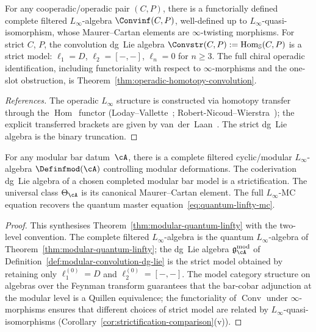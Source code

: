\begin{theorem}
\label{thm:operadic-homotopy-convolution-modular}
For any cooperadic/operadic pair $(C,P)$, there is a functorially
defined complete filtered $L_\infty$-algebra $\Convinf(C,P)$,
well-defined up to $L_\infty$-quasi-isomorphism, whose
Maurer--Cartan elements are $\infty$-twisting morphisms.
For strict $C$, $P$, the convolution dg~Lie algebra
$\Convstr(C,P) := \operatorname{Hom}_{\mathbb{S}}(C,P)$ is a
strict model: $\ell_1 = D$, $\ell_2 = [-,-]$,
$\ell_n = 0$ for $n \geq 3$.
The full chiral operadic identification, including
functoriality with respect to $\infty$-morphisms
and the one-slot obstruction, is
Theorem~\textup{\ref{thm:operadic-homotopy-convolution}}.
\end{theorem}

\begin{proof}[References]
The operadic $L_\infty$ structure is constructed via homotopy
transfer through the $\operatorname{Hom}$~functor
(Loday--Vallette~\cite[Thm~10.3.8]{LV12}; Robert-Nicoud--Wierstra~\cite[Thm~4.1]{RNW19}); the explicit
transferred brackets are given by van~der~Laan~\cite{vdL03}.
The strict dg~Lie algebra is the binary truncation.
\end{proof}

\begin{theorem}
\label{thm:modular-homotopy-convolution}
For any modular bar datum~$\cA$, there is a complete filtered
cyclic/modular $L_\infty$-algebra $\Definfmod(\cA)$ controlling
modular deformations.  The coderivation dg~Lie algebra of a
chosen completed modular bar model is a strictification.
The universal class $\Theta_{\cA}$ is its canonical
Maurer--Cartan element.  The full $L_\infty$-MC equation
recovers the quantum master
equation~\eqref{eq:quantum-linfty-mc}.
\end{theorem}

\begin{proof}
This synthesises Theorem~\ref{thm:modular-quantum-linfty} with
the two-level convention.  The complete filtered $L_\infty$-algebra
is the quantum $L_\infty$-algebra of
Theorem~\ref{thm:modular-quantum-linfty}; the dg~Lie algebra
$\mathfrak{g}_{\cA}^{\mathrm{mod}}$ of
Definition~\ref{def:modular-convolution-dg-lie} is the strict
model obtained by retaining only $\ell_1^{(0)} = D$ and
$\ell_2^{(0)} = [-,-]$.
The model category structure on algebras over the Feynman transform
\cite[Theorem~2.1]{Val16} guarantees that the bar-cobar adjunction
at the modular level is a Quillen equivalence; the functoriality of
$\operatorname{Conv}$ under $\infty$-morphisms
\cite[Theorem~5.1]{RNW19} ensures that different choices of
strict model are related by $L_\infty$-quasi-isomorphisms
(Corollary~\ref{cor:strictification-comparison}(v)).
\end{proof}

